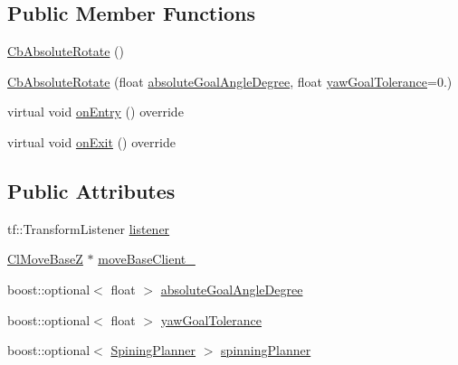 \subsection*{Public Member Functions}
\begin{DoxyCompactItemize}
\item 
\hyperlink{classcl__move__base__z_1_1CbAbsoluteRotate_a378516095c2ad66f52e50f6d7c32678e}{Cb\+Absolute\+Rotate} ()
\item 
\hyperlink{classcl__move__base__z_1_1CbAbsoluteRotate_ac2149ffade91cd127e476b3ece3300dd}{Cb\+Absolute\+Rotate} (float \hyperlink{classcl__move__base__z_1_1CbAbsoluteRotate_ad5d0e21549940444e1cb525cda73329a}{absolute\+Goal\+Angle\+Degree}, float \hyperlink{classcl__move__base__z_1_1CbAbsoluteRotate_a8d8b5b9c2c821efe101bb07c96c4bdd3}{yaw\+Goal\+Tolerance}=0.)
\item 
virtual void \hyperlink{classcl__move__base__z_1_1CbAbsoluteRotate_a10418ea360809fa649d295716b152b2b}{on\+Entry} () override
\item 
virtual void \hyperlink{classcl__move__base__z_1_1CbAbsoluteRotate_a0e362b8e9f0d7de5aeee183ba4031437}{on\+Exit} () override
\end{DoxyCompactItemize}
\subsection*{Public Attributes}
\begin{DoxyCompactItemize}
\item 
tf\+::\+Transform\+Listener \hyperlink{classcl__move__base__z_1_1CbAbsoluteRotate_ad946bb6486dc35baf03ec1cc430a3406}{listener}
\item 
\hyperlink{classcl__move__base__z_1_1ClMoveBaseZ}{Cl\+Move\+BaseZ} $\ast$ \hyperlink{classcl__move__base__z_1_1CbAbsoluteRotate_a8ddbef73316ff96f30493b28b5627e35}{move\+Base\+Client\+\_\+}
\item 
boost\+::optional$<$ float $>$ \hyperlink{classcl__move__base__z_1_1CbAbsoluteRotate_ad5d0e21549940444e1cb525cda73329a}{absolute\+Goal\+Angle\+Degree}
\item 
boost\+::optional$<$ float $>$ \hyperlink{classcl__move__base__z_1_1CbAbsoluteRotate_a8d8b5b9c2c821efe101bb07c96c4bdd3}{yaw\+Goal\+Tolerance}
\item 
boost\+::optional$<$ \hyperlink{classcl__move__base__z_1_1CbAbsoluteRotate_ab8d45e43594a3fc6a71c08f07b5dbef0}{Spining\+Planner} $>$ \hyperlink{classcl__move__base__z_1_1CbAbsoluteRotate_a17d836524599af072cf2e3488e491a91}{spinning\+Planner}
\end{DoxyCompactItemize}
